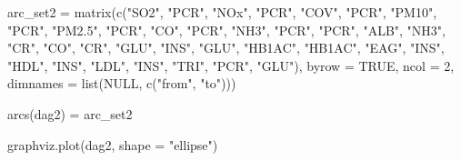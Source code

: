 \documentclass[
  11pt,
  a4paper,
]{article}
\newenvironment{Shaded}{\begin{snugshade}}{\end{snugshade}}
\newcommand{\AttributeTok}[1]{\textcolor[rgb]{0.40,0.45,0.13}{#1}}
\newcommand{\ConstantTok}[1]{\textcolor[rgb]{0.56,0.35,0.01}{#1}}
\newcommand{\DecValTok}[1]{\textcolor[rgb]{0.68,0.00,0.00}{#1}}
\newcommand{\FunctionTok}[1]{\textcolor[rgb]{0.28,0.35,0.67}{#1}}
\newcommand{\NormalTok}[1]{\textcolor[rgb]{0.00,0.23,0.31}{#1}}
\newcommand{\OtherTok}[1]{\textcolor[rgb]{0.00,0.23,0.31}{#1}}
\newcommand{\StringTok}[1]{\textcolor[rgb]{0.13,0.47,0.30}{#1}}
\begin{document}
\begin{Shaded}
\begin{Highlighting}[numbers=left,,]
\NormalTok{arc\_set2 }\OtherTok{=} \FunctionTok{matrix}\NormalTok{(}\FunctionTok{c}\NormalTok{(}\StringTok{"SO2"}\NormalTok{, }\StringTok{"PCR"}\NormalTok{,}
                    \StringTok{"NOx"}\NormalTok{, }\StringTok{"PCR"}\NormalTok{,}
                    \StringTok{"COV"}\NormalTok{, }\StringTok{"PCR"}\NormalTok{,}
                    \StringTok{"PM10"}\NormalTok{, }\StringTok{"PCR"}\NormalTok{,}
                    \StringTok{"PM2.5"}\NormalTok{, }\StringTok{"PCR"}\NormalTok{,}
                    \StringTok{"CO"}\NormalTok{, }\StringTok{"PCR"}\NormalTok{,}
                    \StringTok{"NH3"}\NormalTok{, }\StringTok{"PCR"}\NormalTok{,}
                    \StringTok{"PCR"}\NormalTok{, }\StringTok{"ALB"}\NormalTok{,}
                    \StringTok{"NH3"}\NormalTok{, }\StringTok{"CR"}\NormalTok{,}
                    \StringTok{"CO"}\NormalTok{, }\StringTok{"CR"}\NormalTok{,}
                    \StringTok{"GLU"}\NormalTok{, }\StringTok{"INS"}\NormalTok{,}
                    \StringTok{"GLU"}\NormalTok{, }\StringTok{"HB1AC"}\NormalTok{,}
                    \StringTok{"HB1AC"}\NormalTok{, }\StringTok{"EAG"}\NormalTok{,}
                    \StringTok{"INS"}\NormalTok{, }\StringTok{"HDL"}\NormalTok{,}
                    \StringTok{"INS"}\NormalTok{, }\StringTok{"LDL"}\NormalTok{,}
                    \StringTok{"INS"}\NormalTok{, }\StringTok{"TRI"}\NormalTok{,}
                    \StringTok{"PCR"}\NormalTok{, }\StringTok{"GLU"}\NormalTok{), }\AttributeTok{byrow =} \ConstantTok{TRUE}\NormalTok{, }\AttributeTok{ncol =} \DecValTok{2}\NormalTok{,}
                  \AttributeTok{dimnames =} \FunctionTok{list}\NormalTok{(}\ConstantTok{NULL}\NormalTok{, }\FunctionTok{c}\NormalTok{(}\StringTok{"from"}\NormalTok{, }\StringTok{"to"}\NormalTok{)))}
\end{Highlighting}
\end{Shaded}

\begin{Shaded}
\begin{Highlighting}[numbers=left,,]
\FunctionTok{arcs}\NormalTok{(dag2) }\OtherTok{=}\NormalTok{ arc\_set2}
\end{Highlighting}
\end{Shaded}

\begin{Shaded}
\begin{Highlighting}[numbers=left,,]
\FunctionTok{graphviz.plot}\NormalTok{(dag2, }\AttributeTok{shape =} \StringTok{"ellipse"}\NormalTok{)}
\end{Highlighting}
\end{Shaded}
\end{document}
